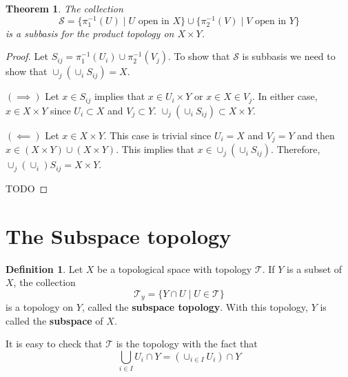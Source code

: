 \documentclass[12pt,reqno]{amsart}
\theoremstyle{plain}
\newtheorem{thm}{Theorem}
\theoremstyle{definition}
\newtheorem{defn}{Definition}
\newcommand{\cal}[1]{\mathcal{#1}}
\begin{document}
\begin{thm}
    The collection
    $$ \cal S = \{\pi_1^{-1}(U) \mid U \text{ open in } X\} \cup \{\pi_2^{-1}(V) \mid V \text{ open in } Y\}$$
    is a subbasis for the product topology on $X \times Y$.
\end{thm}
\begin{proof}
    Let $S_{ij} = \pi_1^{-1}(U_i) \cup \pi_2^{-1}(V_j)$. To show that $\cal S$ is subbasis we need to show that $\cup_j(\cup_i S_{ij}) = X$. 
    
    \noindent $(\implies)$ Let $x \in S_{ij}$ implies that $x \in U_i \times Y$ or $x \in X \in V_j$. In either case, $x \in X \times Y$ since $U_i \subset X$ and $V_j \subset Y$. $\cup_j(\cup_i S_{ij}) \subset X \times Y$.

    \noindent $(\impliedby)$ Let $x \in X \times Y$. This case is trivial since $U_i = X$ and $V_j = Y$ and then $x \in (X \times Y) \cup (X \times Y)$. This implies that $x \in \cup_j(\cup_i S_{ij})$. Therefore, $\cup_j(\cup_i)S_{ij} = X \times Y$. 

    TODO
\end{proof}

\section{The Subspace topology}
\begin{defn}
    Let $X$ be a topological space with topology $\cal T$. If $Y$ is a subset of $X$, the collection
    $$ \cal T_y = \{Y \cap U \mid U \in \cal T\} $$
    is a topology on $Y$, called the {\bf subspace topology}. With this topology, $Y$ is called the {\bf subspace} of $X$.
\end{defn}
It is easy to check that $\cal T$ is the topology with the fact that 
$$ \bigcup_{i \in I} U_i \cap Y = (\cup_{i \in I} U_i) \cap Y$$
\end{document}
